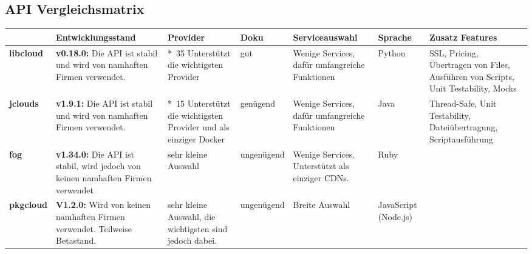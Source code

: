 
\begin{landscape}
  \subsection{API Vergleichsmatrix}
  \label{API Vergleichsmatrix}
\begin{table}[h]  
  \begin{tabularx}{\linewidth}{|l|X|X|l|X|l|X|}
    \hline
    &
    \textbf{Entwicklungsstand}
    &
    \textbf{Provider}
    &
    \textbf{Doku}
    &
    \textbf{Serviceauswahl}
    &
    \textbf{Sprache}
    &
    \textbf{Zusatz Features}
   \\
  \hline
  \textbf{libcloud} & \cellcolor{green!25} \textbf{v0.18.0:} 
  Die API ist stabil und wird von namhaften Firmen verwendet.
  & 
  \cellcolor{green!25}
  *~35 Unterstützt die wichtigsten Provider
  & 
   \cellcolor{green!25}
   gut
  & 
   \cellcolor{green!25}
  Wenige Services, dafür umfangreiche Funktionen
  & 
     \cellcolor{yellow!25}
  Python
  & 
  \cellcolor{green!25}
  SSL, Pricing, Übertragen von Files, Ausführen von Scripts, Unit Testability, Mocks
  \\
  \hline
 \textbf{jclouds}
& 
\cellcolor{green!25} 
\textbf{v1.9.1:} Die API ist stabil und wird von namhaften 
Firmen verwendet.
&	
\cellcolor{green!25}
*~15
Unterstützt die wichtigsten Provider und als einziger Docker
&
\cellcolor{yellow!25}
genügend
&
\cellcolor{green!25}
Wenige Services, dafür umfangreiche Funktionen	
&
\cellcolor{green!25}
Java	
&
\cellcolor{green!25}
Thread-Safe, Unit Testability, Dateiübertragung, Scriptausführung
 \\
 \hline
 \textbf{fog}
 &
 \cellcolor{yellow!25}	
 \textbf{v1.34.0:} 
 Die API ist stabil, wird jedoch von keinen namhaften Firmen verwendet
 &
 \cellcolor{red!50}
 sehr kleine Auswahl
 &
  \cellcolor{red!50}	
ungenügend	
&
 \cellcolor{red!50}
Wenige Services. Unterstützt als einziger CDNs.	
&
 \cellcolor{red!50}
Ruby
&
 \cellcolor{red!50}
\\
\hline
\textbf{pkgcloud}
&
 \cellcolor{yellow!25}	
\textbf{V1.2.0:} Wird von keinen namhaften Firmen verwendet. Teilweise Betastand.
&
\cellcolor{green!25}
sehr kleine Auswahl, die wichtigsten sind jedoch dabei.
&
\cellcolor{red!50}
ungenügend	
&
\cellcolor{green!25}
Breite Auswahl
&
 \cellcolor{yellow!25}	
JavaScript (Node.js)
&
 \cellcolor{yellow!25}	

\end{tabularx}
\end{table}
\end{landscape}
